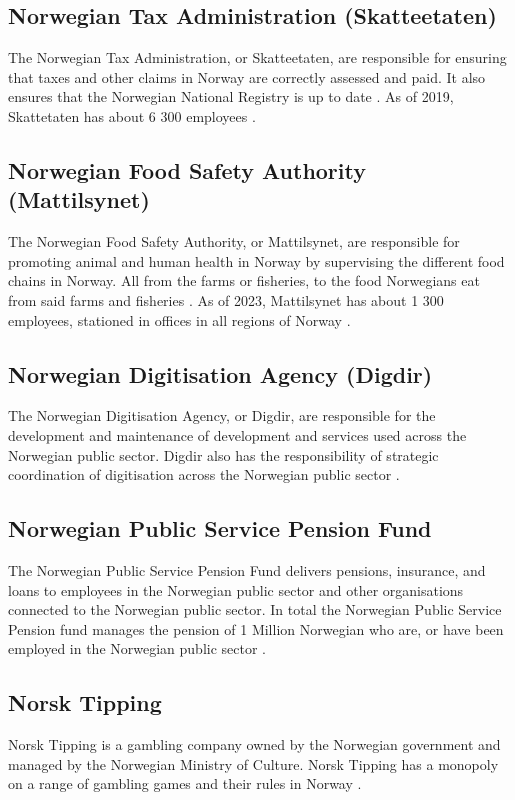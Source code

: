 \subsection{Norwegian Tax Administration (Skatteetaten)}
The Norwegian Tax Administration, or Skatteetaten, are responsible for ensuring that taxes and other claims in Norway are correctly assessed and paid. It also ensures that the Norwegian National Registry is up to date \cite{skatt_r_2023}. As of 2019, Skattetaten has about 6 300 employees \cite{skatt_r_2023}. 

\subsection{Norwegian Food Safety Authority (Mattilsynet)}
The Norwegian Food Safety Authority, or Mattilsynet, are responsible for promoting animal and human health in Norway by supervising the different food chains in Norway. All from the farms or fisheries, to the food Norwegians eat from said farms and fisheries \cite{mat_r_2023}. As of 2023, Mattilsynet has about 1 300 employees, stationed in offices in all regions of Norway \cite{org_mat_2023}.

\subsection{Norwegian Digitisation Agency (Digdir)}
The Norwegian Digitisation Agency, or Digdir, are responsible for the development and maintenance of development and services used across the Norwegian public sector. Digdir also has the responsibility of strategic coordination of digitisation across the Norwegian public sector \cite{digdir_r_2023}.

\subsection{Norwegian Public Service Pension Fund}
The Norwegian Public Service Pension Fund delivers pensions, insurance, and loans to employees in the Norwegian public sector and other organisations connected to the Norwegian public sector. In total the Norwegian Public Service Pension fund manages the pension of 1 Million Norwegian who are, or have been employed in the Norwegian public sector \cite{statens_pensjonskasse_2023}.

\subsection{Norsk Tipping}
Norsk Tipping is a gambling company owned by the Norwegian government and managed by the Norwegian Ministry of Culture. Norsk Tipping has a monopoly on a range of gambling games and their rules in Norway \cite{norsk_tipping_wiki_2023}.

